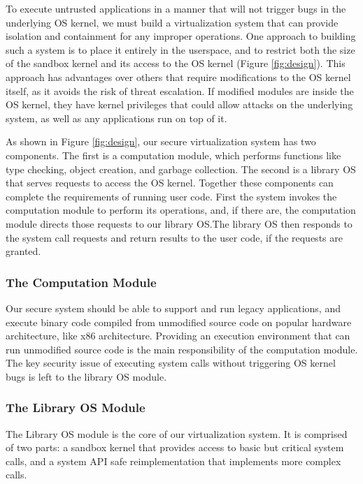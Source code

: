 {To execute untrusted applications in a manner that will not trigger bugs
in the underlying OS kernel, %
we must build a virtualization system that can provide isolation and
containment for any improper operations.
One approach to building such a system is to place it entirely in the userspace,
and to restrict both the size of the sandbox kernel and its access to the
OS kernel (Figure \ref{fig:design}).
This approach has advantages over others that require modifications to
the OS kernel itself, as it avoids the risk of threat escalation. If modified modules
are inside the OS kernel, they have kernel privileges that could allow attacks
on the underlying system, as well as any applications run on top of it.

As shown in Figure \ref{fig:design}, our secure virtualization system
has two components.
The first is a computation module, which performs functions like type checking,
object creation, and garbage collection. The second is a library OS that
serves requests to access the OS kernel.
Together these components can complete the requirements of running user code.
First the system invokes the computation module to perform its operations,
and, if there are, the computation module directs those requests to our
library OS.The library OS then responds to the system call requests and
return results to the user code, if the requests are granted.

\subsubsection{The Computation Module}

Our secure system should be able to support and run legacy applications,
and execute binary code compiled from unmodified source code on popular hardware architecture,
like x86 architecture. Providing an execution environment that can run unmodified source code is
the main responsibility of the computation module. The key security issue of executing system calls
without triggering OS kernel bugs is left to the library OS module.

\subsubsection{The Library OS Module}

The Library OS module is the core of our virtualization system. It is comprised
of two parts: a sandbox kernel that provides access to basic but critical
system calls, and a system API safe reimplementation that implements more
complex calls. 

}
